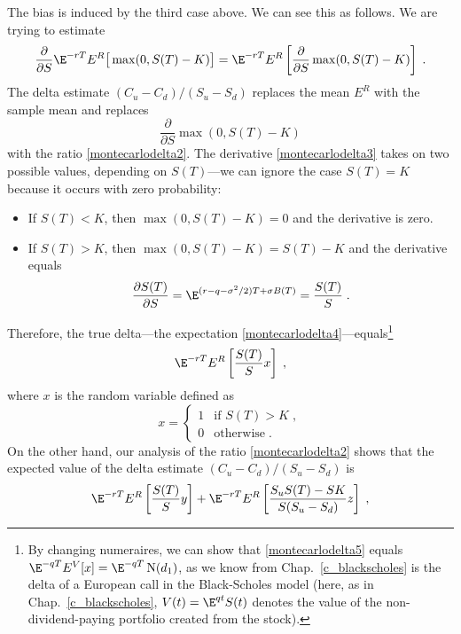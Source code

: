 The bias is induced by the third case above.  We can see this as follows.  We are trying to estimate
\begin{equation}\label{montecarlodelta4}
\frac{\partial }{\partial S} \E^{-rT}E^R \big[\max(0,S(T)-K)\big] = \E^{-rT}E^R  \left[ \frac{\partial }{\partial S} \max(0,S(T)-K)\right]\;.
\end{equation}
The delta estimate $(C_u-C_d)/(S_u-S_d)$ replaces the mean $E^R$ with the sample mean and replaces
\begin{equation}\label{montecarlodelta3}
\frac{\partial }{\partial S} \max(0,S(T)-K)
\end{equation}
with the ratio \eqref{montecarlodelta2}.  
The derivative \eqref{montecarlodelta3} takes on two possible values, depending on $S(T)$---we can ignore the case $S(T)=K$ because it occurs with zero probability:
\begin{itemize}
\item If $S(T) < K$, then $\max(0,S(T)-K) = 0$ and the derivative is zero.
\item If $S(T)>K$,  then $\max(0,S(T)-K) = S(T)-K$ and the derivative equals 
$$\frac{\partial S(T)}{\partial S}=\E^{(r-q-\sigma^2/2)T + \sigma B(T)} = \frac{S(T)}{S}\; .$$
\end{itemize}
Therefore, the true delta---the expectation \eqref{montecarlodelta4}---equals\footnote{By changing numeraires, we can show that \eqref{montecarlodelta5} equals $\E^{-qT}E^V[x] = \E^{-qT}\N(d_1)$, as we know from Chap.~\ref{c_blackscholes} is the delta of a European call in the Black-Scholes model (here, as in Chap.~\ref{c_blackscholes}, $V(t)=\E^{qt}S(t)$ denotes the value of the non-dividend-paying portfolio created from the stock).} 
\begin{equation}\label{montecarlodelta5}
\E^{-rT}E^R\left[\frac{S(T)}{S} x\right]\;,
\end{equation}
where $x$ is the random variable defined as
\begin{equation*}
x =  \begin{cases} 1 & \text{if $S(T)>K$}\; ,\\
0 & \text{otherwise}\;.
\end{cases}
\end{equation*}
 On the other hand, our  analysis of the ratio \eqref{montecarlodelta2} shows that the expected value of the delta estimate $(C_u-C_d)/(S_u-S_d)$ is
\begin{equation}\label{montecarlodelta6}
\E^{-rT}E^R\left[\frac{S(T)}{S} y\right] + \E^{-rT}E^R\left[\frac{S_uS(T)-SK}{S(S_u-S_d)}z\right]\;,
\end{equation}

